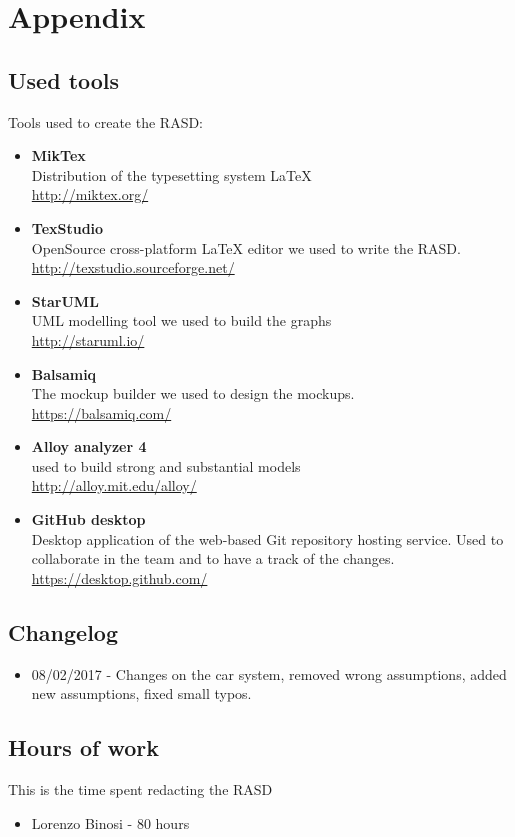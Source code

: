 \appendix
\section{Appendix}
\subsection{Used tools}
Tools used to create the RASD:
\begin{itemize}
	\item \textbf{MikTex} \\ Distribution of the typesetting system LaTeX \\ \url{http://miktex.org/} 
	\item \textbf{TexStudio}\\ OpenSource cross-platform LaTeX editor we used to write the RASD. \\ \url{http://texstudio.sourceforge.net/} 
	\item \textbf{StarUML}\\ UML modelling tool we used to build the graphs\\ \url{http://staruml.io/} 
	\item \textbf{Balsamiq}\\ The mockup builder we used to design the mockups. \\ \url{https://balsamiq.com/} 
	\item \textbf{Alloy analyzer 4}\\ used to build  strong and substantial models \\ \url{ http://alloy.mit.edu/alloy/}
	\item \textbf{GitHub desktop}\\ Desktop application of the web-based Git repository hosting service. Used to collaborate in the team and to have a track of the changes.  \\ \url{https://desktop.github.com/} 
\end{itemize}

\subsection{Changelog}
\begin{itemize}
	\item 08/02/2017 - Changes on the car system, removed wrong assumptions, added new assumptions, fixed small typos.
\end{itemize}

\subsection{Hours of work}
This is the time spent redacting the RASD
\begin{itemize}
	\item {Lorenzo Binosi} - 80 hours
\end{itemize}

